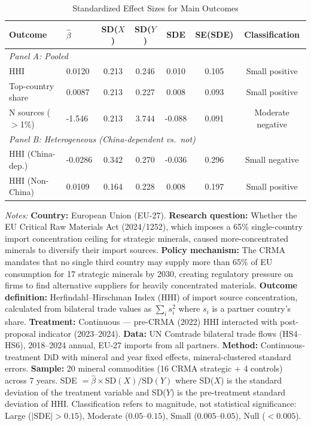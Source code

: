 \begin{table}[H]
\centering
\caption{Standardized Effect Sizes for Main Outcomes}
\label{tab:sde}
\begin{threeparttable}
\begin{tabular}{llccccc}
\toprule
Outcome & $\hat{\beta}$ & SD($X$) & SD($Y$) & SDE & SE(SDE) & Classification \\
\midrule
\multicolumn{7}{l}{\textit{Panel A: Pooled}} \\
HHI & 0.0120 & 0.213 & 0.246 & 0.010 & 0.105 & Small positive \\
Top-country share & 0.0087 & 0.213 & 0.227 & 0.008 & 0.093 & Small positive \\
N sources ($>$1\%) & -1.546 & 0.213 & 3.744 & -0.088 & 0.091 & Moderate negative \\
\midrule
\multicolumn{7}{l}{\textit{Panel B: Heterogeneous (China-dependent vs.~not)}} \\
HHI (China-dep.) & -0.0286 & 0.342 & 0.270 & -0.036 & 0.296 & Small negative \\
HHI (Non-China) & 0.0109 & 0.164 & 0.228 & 0.008 & 0.197 & Small positive \\
\bottomrule
\end{tabular}
\begin{tablenotes}[flushleft]
\small
\item \textit{Notes:} \textbf{Country:} European Union (EU-27). \textbf{Research question:} Whether the EU Critical Raw Materials Act (2024/1252), which imposes a 65\% single-country import concentration ceiling for strategic minerals, caused more-concentrated minerals to diversify their import sources. \textbf{Policy mechanism:} The CRMA mandates that no single third country may supply more than 65\% of EU consumption for 17 strategic minerals by 2030, creating regulatory pressure on firms to find alternative suppliers for heavily concentrated materials. \textbf{Outcome definition:} Herfindahl--Hirschman Index (HHI) of import source concentration, calculated from bilateral trade values as $\sum_i s_i^2$ where $s_i$ is a partner country's share. \textbf{Treatment:} Continuous --- pre-CRMA (2022) HHI interacted with post-proposal indicator (2023--2024). \textbf{Data:} UN Comtrade bilateral trade flows (HS4--HS6), 2018--2024 annual, EU-27 imports from all partners. \textbf{Method:} Continuous-treatment DiD with mineral and year fixed effects, mineral-clustered standard errors. \textbf{Sample:} 20 mineral commodities (16 CRMA strategic + 4 controls) across 7 years. SDE $= \hat{\beta} \times \text{SD}(X) / \text{SD}(Y)$ where SD($X$) is the standard deviation of the treatment variable and SD($Y$) is the pre-treatment standard deviation of HHI. Classification refers to magnitude, not statistical significance: Large ($|$SDE$| > 0.15$), Moderate ($0.05$--$0.15$), Small ($0.005$--$0.05$), Null ($< 0.005$).
\end{tablenotes}
\end{threeparttable}
\end{table}
